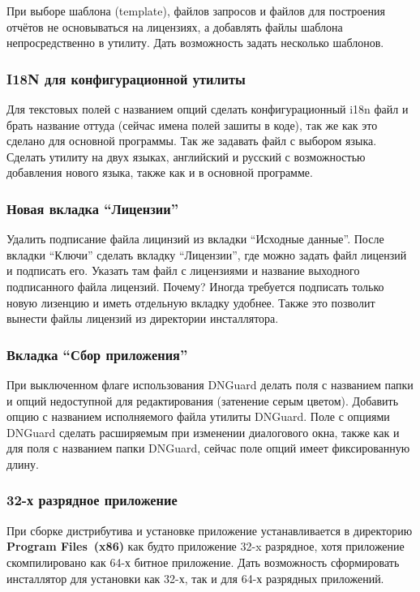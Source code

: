 При выборе шаблона (template), файлов запросов и файлов для построения отчётов не основываться на
лицензиях, а добавлять файлы шаблона непросредственно в утилиту. Дать возможность задать несколько
шаблонов.

\subsubsection{I18N для конфигурационной утилиты}

Для текстовых полей с названием опций сделать конфигурационный i18n файл и брать название оттуда
(сейчас имена полей зашиты в коде), так же как это сделано для основной программы. Так же задавать
файл с выбором языка. Сделать утилиту на двух языках, английский и русский с возможностью добавления
нового языка, также как и в основной программе.

\subsubsection{Новая вкладка ``Лицензии''}

Удалить подписание файла лицинзий из вкладки ``Исходные данные''. После вкладки ``Ключи'' сделать
вкладку ``Лицензии'', где можно задать файл лицензий и подписать его. Указать там файл с лицензиями
и название выходного подписанного файла лицензий. Почему? Иногда требуется подписать только новую
лизенцию и иметь отдельную вкладку удобнее. Также это позволит вынести файлы лицензий из директории
инсталлятора.

\subsubsection{Вкладка ``Сбор приложения''}

При выключенном флаге использования DNGuard делать поля с названием папки и опций недоступной для
редактирования (затенение серым цветом). Добавить опцию с названием исполняемого файла утилиты
DNGuard. Поле с опциями DNGuard сделать расширяемым при изменении диалогового окна, также как и для
поля с названием папки DNGuard, сейчас поле опций имеет фиксированную длину.

\subsubsection{32-х разрядное приложение}

При сборке дистрибутива и установке приложение устанавливается в директорию \textbf{Program
Files~(x86)} как будто приложение 32-x разрядное, хотя приложение скомпилировано как 64-х битное
приложение. Дать возможность сформировать инсталлятор для установки как 32-х, так и для 64-х
разрядных приложений.

